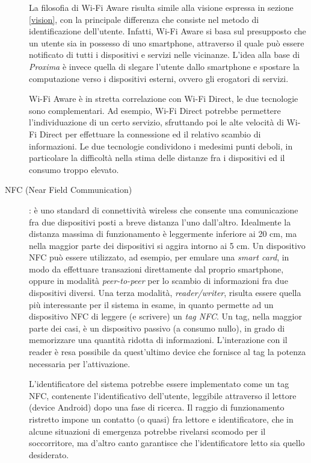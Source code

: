 \documentclass[a4paper,12pt]{report}
\begin{document}
\begin{description}
	La filosofia di Wi-Fi Aware risulta simile alla visione espressa in sezione \ref{vision}, con la principale differenza che consiste nel metodo di identificazione dell'utente. Infatti, Wi-Fi Aware si basa sul presupposto che un utente sia in possesso di uno smartphone, attraverso il quale può essere notificato di tutti i dispositivi e servizi nelle vicinanze. L'idea alla base di \emph{Proxima} è invece quella di slegare l'utente dallo smartphone e spostare la computazione verso i dispositivi esterni, ovvero gli erogatori di servizi. 
	
	Wi-Fi Aware è in stretta correlazione con Wi-Fi Direct, le due tecnologie sono complementari. Ad esempio, Wi-Fi Direct potrebbe permettere l'individuazione di un certo servizio, sfruttando poi le alte velocità di Wi-Fi Direct per effettuare la connessione ed il relativo scambio di informazioni. Le due tecnologie condividono i medesimi punti deboli, in particolare la difficoltà nella stima delle distanze fra i dispositivi ed il consumo troppo elevato.
	
	\item[NFC (Near Field Communication)] : è uno standard di connettività wireless che consente una comunicazione fra due dispositivi posti a breve distanza l'uno dall'altro. Idealmente la distanza massima di funzionamento è leggermente inferiore ai 20 cm, ma nella maggior parte dei dispositivi si aggira intorno ai 5 cm. Un dispositivo NFC può essere utilizzato, ad esempio, per emulare una \emph{smart card}, in modo da effettuare transazioni direttamente dal proprio smartphone, oppure in modalità \emph{peer-to-peer} per lo scambio di informazioni fra due dispositivi diversi. Una terza modalità, \emph{reader/writer}, risulta essere quella più interessante per il sistema in esame, in quanto permette ad un dispositivo NFC di leggere (e scrivere) un \emph{tag NFC}. Un tag, nella maggior parte dei casi, è un dispositivo passivo (a consumo nullo), in grado di memorizzare una quantità ridotta di informazioni. L'interazione con il reader è resa possibile da quest'ultimo device che fornisce al tag la potenza necessaria per l'attivazione. 
	
	L'identificatore del sistema potrebbe essere implementato come un tag NFC, contenente l'identificativo dell'utente, leggibile attraverso il lettore (device Android) dopo una fase di ricerca. Il raggio di funzionamento ristretto impone un contatto (o quasi) fra lettore e identificatore, che in alcune situazioni di emergenza potrebbe rivelarsi scomodo per il soccorritore, ma d'altro canto garantisce che l'identificatore letto sia quello desiderato.
\end{description}
\end{document}
